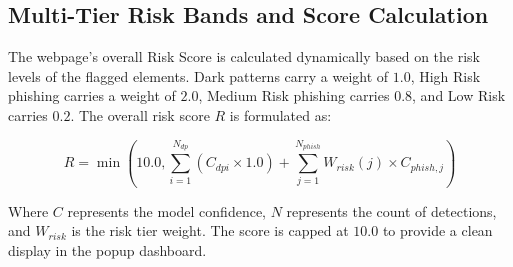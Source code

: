 \subsection{Multi-Tier Risk Bands and Score Calculation}
The webpage's overall Risk Score is calculated dynamically based on the risk levels of the flagged elements. Dark patterns carry a weight of $1.0$, High Risk phishing carries a weight of $2.0$, Medium Risk phishing carries $0.8$, and Low Risk carries $0.2$. The overall risk score $R$ is formulated as:

\begin{equation}
R = \min\left(10.0, \sum_{i=1}^{N_{dp}} (C_{dpi} \times 1.0) + \sum_{j=1}^{N_{phish}} W_{risk}(j) \times C_{phish,j} \right)
\end{equation}

Where $C$ represents the model confidence, $N$ represents the count of detections, and $W_{risk}$ is the risk tier weight. The score is capped at $10.0$ to provide a clean display in the popup dashboard.
